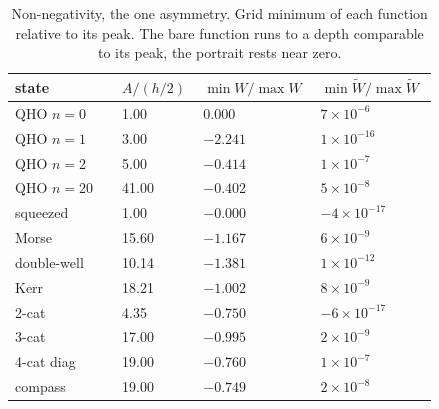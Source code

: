 \documentclass[%
  aps, amsmath, amssymb, onecolumn, 11pt
]{revtex4-2}
\begin{document}
\begin{table}[ht]
\centering
\renewcommand{\arraystretch}{1.2}
\begin{tabular}{@{}p{0.24\linewidth} p{0.14\linewidth} p{0.22\linewidth} p{0.24\linewidth}@{}}
\toprule
state & $A/(h/2)$ & $\min W/\max W$ & $\min\widetilde W/\max\widetilde W$ \\
\midrule
QHO $n=0$    & 1.00  & $0.000$  & $7\times10^{-6}$ \\
QHO $n=1$    & 3.00  & $-2.241$ & $1\times10^{-16}$ \\
QHO $n=2$    & 5.00  & $-0.414$ & $1\times10^{-7}$ \\
QHO $n=20$   & 41.00 & $-0.402$ & $5\times10^{-8}$ \\
squeezed     & 1.00  & $-0.000$ & $-4\times10^{-17}$ \\
Morse        & 15.60 & $-1.167$ & $6\times10^{-9}$ \\
double-well  & 10.14 & $-1.381$ & $1\times10^{-12}$ \\
Kerr         & 18.21 & $-1.002$ & $8\times10^{-9}$ \\
2-cat        & 4.35  & $-0.750$ & $-6\times10^{-17}$ \\
3-cat        & 17.00 & $-0.995$ & $2\times10^{-9}$ \\
4-cat diag   & 19.00 & $-0.760$ & $1\times10^{-7}$ \\
compass      & 19.00 & $-0.749$ & $2\times10^{-8}$ \\
\bottomrule
\end{tabular}
\caption{Non-negativity, the one asymmetry. Grid minimum of each function
relative to its peak. The bare function runs to a depth comparable to its peak,
the portrait rests near zero.}
\label{tab:nonneg}
\end{table}

\clearpage


\end{document}
